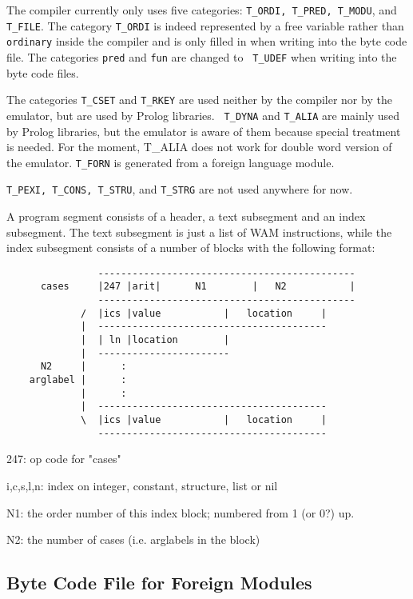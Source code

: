 \documentclass[11pt]{article}
\begin{document}
The compiler currently only uses five categories: {\tt T\_ORDI,
T\_PRED, T\_MODU}, and {\tt T\_FILE}. The category {\tt T\_ORDI} is
indeed represented by a free variable rather than {\tt ordinary}
inside the compiler and is only filled in when writing into the byte
code file. The categories {\tt pred} and {\tt fun} are changed to {\tt
T\_UDEF} when writing into the byte code files.

The categories {\tt T\_CSET} and {\tt T\_RKEY} are used neither by the
compiler nor by the emulator, but are used by Prolog libraries.  {\tt
T\_DYNA} and {\tt T\_ALIA} are mainly used by Prolog libraries, but
the emulator is aware of them because special treatment is needed.
For the moment, T\_ALIA does not work for double word version of the
emulator. {\tt T\_FORN} is generated from a foreign language module.

{\tt T\_PEXI, T\_CONS, T\_STRU}, and {\tt T\_STRG} are not used
anywhere for now.

A program segment consists of a header, a text subsegment and an index
subsegment. The text subsegment is just a list of WAM instructions,
while the index subsegment consists of a number of blocks with the
following format:

\begin{verbatim}
                ---------------------------------------------
      cases     |247 |arit|      N1        |   N2           |
                ---------------------------------------------
             /  |ics |value           |   location     |
             |  ----------------------------------------
             |  | ln |location        |
             |  -----------------------
      N2     |      :
    arglabel |      :
             |      :
             |  ----------------------------------------
             \  |ics |value           |   location     |
                ----------------------------------------
\end{verbatim}

       247: op code for "cases"

       i,c,s,l,n: index on integer, constant, structure, list or nil

       N1: the order number of this index block; numbered
           from 1 (or 0?) up.

       N2: the number of cases (i.e. arglabels in the block)


\subsection{Byte Code File for Foreign Modules}
\end{document}
